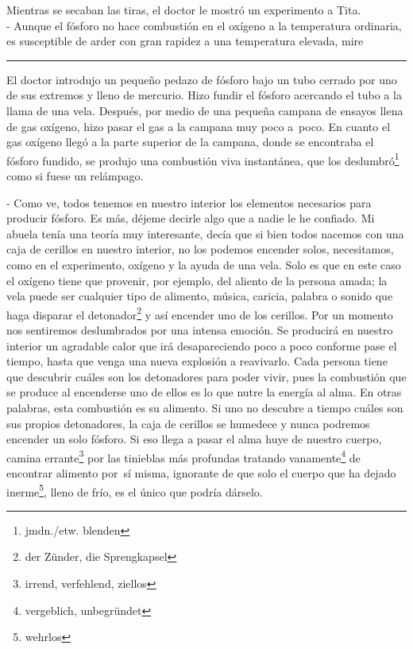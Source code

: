 Mientras se secaban las tiras, el doctor le mostró un experimento a
Tita.
\\- Aunque el fósforo no hace combustión en el oxígeno a la temperatura %
ordinaria, es susceptible de arder con gran rapidez a una temperatura %
elevada, mire \ndots \\
\rule{1em}{0pt}El doctor introdujo un pequeño pedazo de fósforo bajo un tubo cerrado
por uno de sus extremos y lleno de mercurio. Hizo fundir el fósforo
acercando el tubo a la llama de una vela. Después, por medio de una
pequeña campana de ensayos llena de gas oxígeno, hizo pasar el gas a la
campana muy poco a~poco. En cuanto el gas oxígeno llegó a la parte
superior de la campana, donde se encontraba el fósforo fundido, se
produjo una combustión viva instantánea, que los deslumbró\footnote{jmdn./etw. blenden}
como si fuese un relámpago.

- Como ve, todos tenemos en nuestro interior los elementos necesarios %
para producir fósforo. Es más, déjeme decirle algo que a nadie le he %
confiado. Mi abuela tenía una teoría muy interesante, decía que si bien %
todos nacemos con una caja de cerillos en nuestro interior, no los %
podemos encender solos, necesitamos, como en el experimento, oxígeno y %
la ayuda de una vela. Solo es que en este caso el oxígeno tiene que %
provenir, por ejemplo, del aliento de la persona amada; la vela puede %
ser cualquier tipo de alimento, música, caricia, palabra o sonido que %
haga disparar el detonador\footnote{der Zünder, die Sprengkapsel} %
y así encender uno de los cerillos. Por un momento nos sentiremos deslumbrados %
por una intensa emoción. Se producirá en nuestro interior un agradable %
calor que irá desapareciendo poco a poco conforme pase el tiempo, hasta %
que venga una nueva explosión a reavivarlo. %
Cada persona tiene que descubrir cuáles son los detonadores para poder %
vivir, pues la combustión que se produce al encenderse uno de ellos es %
lo que nutre la energía al alma. En otras palabras, esta combustión es %
su alimento. Si uno no descubre a tiempo cuáles son sus propios detonadores, %
la caja de cerillos se humedece y nunca podremos encender un solo fósforo. %
Si eso llega a pasar el alma huye de nuestro cuerpo, camina errante\footnote{irrend, verfehlend, ziellos} %
por las tinieblas más profundas tratando vanamente\footnote{vergeblich, unbegründet} %
de encontrar alimento por~sí misma, ignorante de que solo el cuerpo %
que ha dejado inerme\footnote{wehrlos}, lleno de frío, es el único que %
podría dárselo.\\

